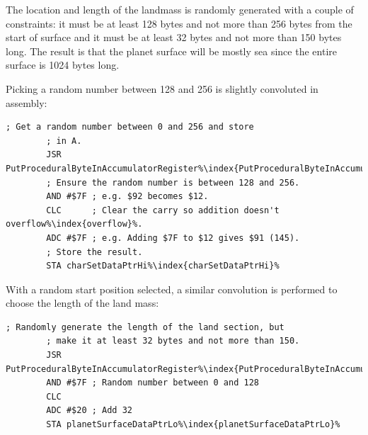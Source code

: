The location and length of the landmass is randomly generated with a couple of constraints:
it must be at least 128 bytes  and not more than 256 bytes from the start of surface and it must be at least 32 bytes
and not more than 150 bytes long. The result is that the planet surface will be mostly sea
since the entire surface is 1024 bytes long.

Picking a random number between 128 and 256 is slightly convoluted in assembly:

\begin{lstlisting}[caption=Convoluted.,escapechar=\%]
        ; Get a random number between 0 and 256 and store
        ; in A.
        JSR PutProceduralByteInAccumulatorRegister%\index{PutProceduralByteInAccumulatorRegister}%
        ; Ensure the random number is between 128 and 256.
        AND #$7F ; e.g. $92 becomes $12.
        CLC      ; Clear the carry so addition doesn't overflow%\index{overflow}%.
        ADC #$7F ; e.g. Adding $7F to $12 gives $91 (145).
        ; Store the result.
        STA charSetDataPtrHi%\index{charSetDataPtrHi}%
\end{lstlisting}

With a random start position selected, a similar convolution is performed to choose the length of the land mass:

\begin{lstlisting}[caption=A convolution.,escapechar=\%]
        ; Randomly generate the length of the land section, but
        ; make it at least 32 bytes and not more than 150.
        JSR PutProceduralByteInAccumulatorRegister%\index{PutProceduralByteInAccumulatorRegister}%
        AND #$7F ; Random number between 0 and 128
        CLC
        ADC #$20 ; Add 32
        STA planetSurfaceDataPtrLo%\index{planetSurfaceDataPtrLo}%

\end{lstlisting}


